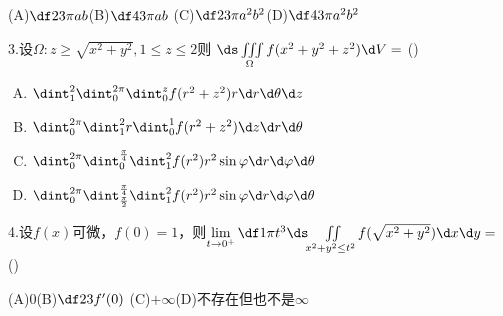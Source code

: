   \quad(A)$\df23\pi ab$\hspace{1cm}(B)$\df43\pi ab$\hspace{1cm}
  (C)$\df23\pi a^2b^2$\hspace{1cm}(D)$\df43\pi a^2b^2$
  
\bigskip
  
3.\;设$\Omega:z\geq{\sqrt{x^2+y^2}},1\leq z\leq 2$则  
  $\ds\iiint\limits_{\Omega}f(x^2+y^2+z^2)\d V=$
  (\underline{\hspace{1cm}})
  \begin{enumerate}[(A)]
    \setlength{\itemindent}{1cm}
    \item $\dint_1^2\dint_0^{2\pi}\dint_0^zf(r^2+z^2)r\d r\d\theta\d z$
    \item $\dint_0^{2\pi}\dint_1^2r\dint_0^1f(r^2+z^2)\d z\d r\d\theta$
    \item $\dint_0^{2\pi}\dint_0^{\frac{\pi}4}\dint_1^2
    f(r^2)r^2\sin\varphi\d r\d\varphi\d\theta$
    \item $\dint_0^{2\pi}\dint_{\frac{\pi}2}^{\frac{\pi}4}\dint_1^2
    f(r^2)r^2\sin\varphi\d r\d\varphi\d\theta$
  \end{enumerate}

\bigskip

4.\;设$f(x)$可微，$f(0)=1$，则$\lim\limits_{t\to0^+}\df1{\pi t^3}
  \ds\iint\limits_{x^2+y^2\leq t^2}  f(\sqrt{x^2+y^2})\d x\d y=$ 
  (\underline{\hspace{1cm}})
  
  \quad(A)$0$\hspace{1cm}(B)$\df23f'(0)$\hspace{1cm}
  (C)$+\infty$\hspace{1cm}(D)不存在但也不是$\infty$

\bigskip


